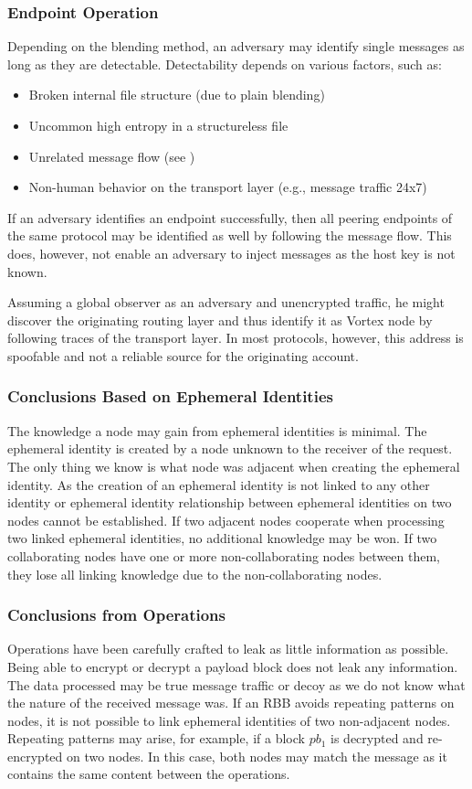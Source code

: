\documentclass[10pt,journal,compsoc]{IEEEtran}
\begin{document}
\subsubsection{Endpoint Operation}
Depending on the blending method, an adversary may identify single messages as long as they are detectable. Detectability depends on various factors, such as:
\begin{itemize}
	\item Broken internal file structure (due to plain blending)
	\item Uncommon high entropy in a structureless file
	\item Unrelated message flow (see \cite{oakland2013-parrot})
	\item Non-human behavior on the transport layer (e.g., message traffic 24x7)
\end{itemize}

If an adversary identifies an endpoint successfully, then all peering endpoints of the same protocol may be identified as well by following the message flow. This does, however, not enable an adversary to inject messages as the host key is not known. 

Assuming a global observer as an adversary and unencrypted traffic, he might discover the originating routing layer and thus identify it as Vortex node by following traces of the transport layer. In most protocols, however, this address is spoofable and not a reliable source for the originating account.

\subsubsection{Conclusions Based on Ephemeral Identities}
The knowledge a node may gain from ephemeral identities is minimal. The ephemeral identity is created by a node unknown to the receiver of the request. The only thing we know is what node was adjacent when creating the ephemeral identity. As the creation of an ephemeral identity is not linked to any other identity or ephemeral identity relationship between ephemeral identities on two nodes cannot be established. If two adjacent nodes cooperate when processing two linked ephemeral identities, no additional knowledge may be won. If two collaborating nodes have one or more non-collaborating nodes between them, they lose all linking knowledge due to the non-collaborating nodes. 

\subsubsection{Conclusions from Operations}
Operations have been carefully crafted to leak as little information as possible. Being able to encrypt or decrypt a payload block does not leak any information. The data processed may be true message traffic or decoy as we do not know what the nature of the received message was. If an RBB avoids repeating patterns on nodes, it is not possible to link ephemeral identities of two non-adjacent nodes. Repeating patterns may arise, for example, if a block $pb_1$ is decrypted and re-encrypted on two nodes. In this case, both nodes may match the message as it contains the same content between the operations.
\end{document}
